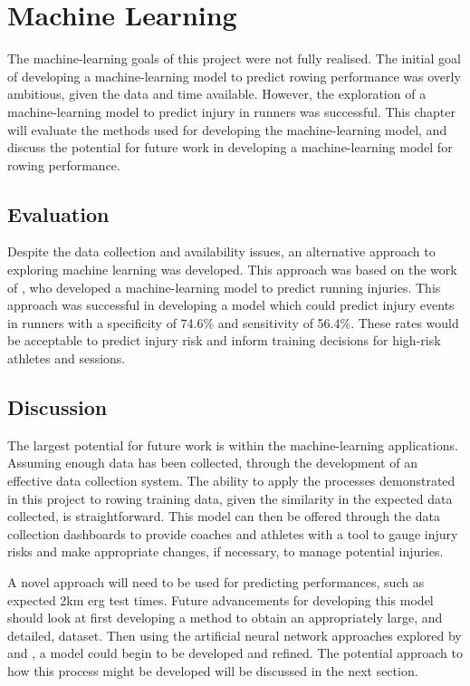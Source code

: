 \section{Machine Learning}
The machine-learning goals of this project were not fully realised. The initial goal of developing a machine-learning model to predict rowing performance was overly ambitious, given the data and time available. However, the exploration of a machine-learning model to predict injury in runners was successful. This chapter will evaluate the methods used for developing the machine-learning model, and discuss the potential for future work in developing a machine-learning model for rowing performance.

\subsection{Evaluation}
Despite the data collection and availability issues, an alternative approach to exploring machine learning was developed. This approach was based on the work of \textcite{Lovdal2021}, who developed a machine-learning model to predict running injuries. This approach was successful in developing a model which could predict injury events in runners with a specificity of 74.6\% and sensitivity of 56.4\%. These rates would be acceptable to predict injury risk and inform training decisions for high-risk athletes and sessions.  

\subsection{Discussion}
The largest potential for future work is within the machine-learning applications. Assuming enough data has been collected, through the development of an effective data collection system. The ability to apply the processes demonstrated in this project to rowing training data, given the similarity in the expected data collected, is straightforward. This model can then be offered through the data collection dashboards to provide coaches and athletes with a tool to gauge injury risks and make appropriate changes, if necessary, to manage potential injuries.

A novel approach will need to be used for predicting performances, such as expected 2km erg test times. Future advancements for developing this model should look at first developing a method to obtain an appropriately large, and detailed, dataset. Then using the artificial neural network approaches explored by \textcite{Edelmannnusser2002} and \textcite{Churchill2014}, a model could begin to be developed and refined. The potential approach to how this process might be developed will be discussed in the next section.

